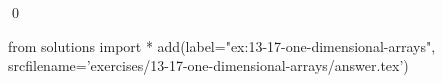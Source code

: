 
\begin{ex}
  \label{ex:13-17-one-dimensional-arrays}
  
  \qed
\end{ex}
\begin{python0}
from solutions import *
add(label="ex:13-17-one-dimensional-arrays",
    srcfilename='exercises/13-17-one-dimensional-arrays/answer.tex')
\end{python0}
